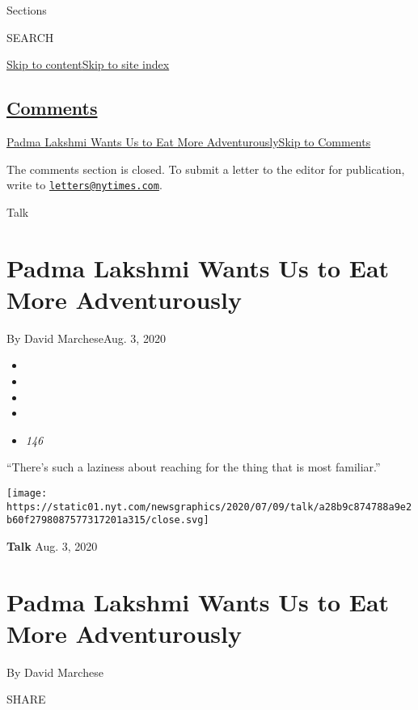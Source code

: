Sections

SEARCH

\protect\hyperlink{site-content}{Skip to
content}\protect\hyperlink{site-index}{Skip to site index}

\hypertarget{comments}{%
\subsection{\texorpdfstring{\protect\hyperlink{commentsContainer}{Comments}}{Comments}}\label{comments}}

\href{}{Padma Lakshmi Wants Us to Eat More Adventurously}\href{}{Skip to
Comments}

The comments section is closed. To submit a letter to the editor for
publication, write to
\href{mailto:letters@nytimes.com}{\nolinkurl{letters@nytimes.com}}.

Talk

\hypertarget{padma-lakshmi-wants-us-to-eat-more-adventurously}{%
\section{Padma Lakshmi Wants Us to Eat More
Adventurously}\label{padma-lakshmi-wants-us-to-eat-more-adventurously}}

By David MarcheseAug. 3, 2020

\begin{itemize}
\item
\item
\item
\item
\item
  \emph{146}
\end{itemize}

``There's such a laziness about reaching for the thing that is most
familiar.''

\texttt{[image: https://static01.nyt.com/newsgraphics/2020/07/09/talk/a28b9c874788a9e2b60f2798087577317201a315/close.svg]}

\textbf{Talk} Aug. 3, 2020

\hypertarget{padma-lakshmi-wants-us-to-eat-more-adventurously-1}{%
\section{Padma Lakshmi Wants Us to Eat More
Adventurously}\label{padma-lakshmi-wants-us-to-eat-more-adventurously-1}}

By David Marchese

SHARE

